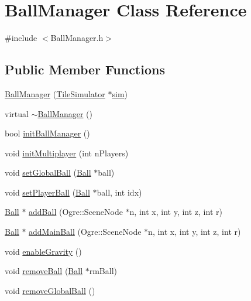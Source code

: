 \hypertarget{classBallManager}{\section{Ball\-Manager Class Reference}
\label{classBallManager}
}


{\ttfamily \#include $<$Ball\-Manager.\-h$>$}

\subsection*{Public Member Functions}
\begin{DoxyCompactItemize}
\item 
\hyperlink{classBallManager_a63b25d78645bea88f1d9742254f92305}{Ball\-Manager} (\hyperlink{classTileSimulator}{Tile\-Simulator} $\ast$\hyperlink{classBallManager_a4916de0948df0af060f6ada4d21284a7}{sim})
\item 
virtual \hyperlink{classBallManager_a1fbda83b56ce78f9fa2c0b3e1d287456}{$\sim$\-Ball\-Manager} ()
\item 
bool \hyperlink{classBallManager_af6eb7ce1ec14906c50ab69fa46eb8b11}{init\-Ball\-Manager} ()
\item 
void \hyperlink{classBallManager_a6b5c8383ec352bfe7c70c469b4e9a31c}{init\-Multiplayer} (int n\-Players)
\item 
void \hyperlink{classBallManager_a7e16e93759654ab1511acf0696e49d44}{set\-Global\-Ball} (\hyperlink{classBall}{Ball} $\ast$ball)
\item 
void \hyperlink{classBallManager_a815ef99a0ff8519df4761be2866e190d}{set\-Player\-Ball} (\hyperlink{classBall}{Ball} $\ast$ball, int idx)
\item 
\hyperlink{classBall}{Ball} $\ast$ \hyperlink{classBallManager_a0391fe48835ab1816ef8f180ff8b42eb}{add\-Ball} (Ogre\-::\-Scene\-Node $\ast$n, int x, int y, int z, int r)
\item 
\hyperlink{classBall}{Ball} $\ast$ \hyperlink{classBallManager_a1eed74d1d8c6070187774fd23f79fa91}{add\-Main\-Ball} (Ogre\-::\-Scene\-Node $\ast$n, int x, int y, int z, int r)
\item 
void \hyperlink{classBallManager_a318d172c88d6e423c1d3f8dc3d5d9557}{enable\-Gravity} ()
\item 
void \hyperlink{classBallManager_aa79158dcf4c003391de0fe8750a6d0ab}{remove\-Ball} (\hyperlink{classBall}{Ball} $\ast$rm\-Ball)
\item 
void \hyperlink{classBallManager_a03aa05fe5f1a7badf3028a2749596eb1}{remove\-Global\-Ball} ()

\end{DoxyCompactItemize}

